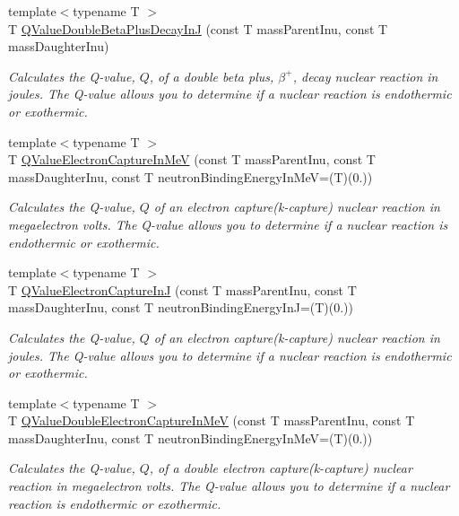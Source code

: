 \begin{DoxyCompactItemize}
{\footnotesize template$<$typename T $>$ }\\T \mbox{\hyperlink{group___e_g_x_phys-_q_value-_beta_plus_ga3531ffda0c561a601a61f54f5c7780df}{Q\+Value\+Double\+Beta\+Plus\+Decay\+InJ}} (const T mass\+Parent\+Inu, const T mass\+Daughter\+Inu)
\begin{DoxyCompactList}\small\item\em Calculates the Q-\/value, $Q$, of a double beta plus, $\beta^+$, decay nuclear reaction in joules. The Q-\/value allows you to determine if a nuclear reaction is endothermic or exothermic. \end{DoxyCompactList}\item 
{\footnotesize template$<$typename T $>$ }\\T \mbox{\hyperlink{group___e_g_x_phys-_q_value-_electron_capture_ga9cd8502b6101614c17114e9710cdcf6c}{Q\+Value\+Electron\+Capture\+In\+MeV}} (const T mass\+Parent\+Inu, const T mass\+Daughter\+Inu, const T neutron\+Binding\+Energy\+In\+MeV=(T)(0.))
\begin{DoxyCompactList}\small\item\em Calculates the Q-\/value, $Q$ of an electron capture(k-\/capture) nuclear reaction in megaelectron volts. The Q-\/value allows you to determine if a nuclear reaction is endothermic or exothermic. \end{DoxyCompactList}\item 
{\footnotesize template$<$typename T $>$ }\\T \mbox{\hyperlink{group___e_g_x_phys-_q_value-_electron_capture_gaf2569f9c706130b730dcf55695780263}{Q\+Value\+Electron\+Capture\+InJ}} (const T mass\+Parent\+Inu, const T mass\+Daughter\+Inu, const T neutron\+Binding\+Energy\+InJ=(T)(0.))
\begin{DoxyCompactList}\small\item\em Calculates the Q-\/value, $Q$ of an electron capture(k-\/capture) nuclear reaction in joules. The Q-\/value allows you to determine if a nuclear reaction is endothermic or exothermic. \end{DoxyCompactList}\item 
{\footnotesize template$<$typename T $>$ }\\T \mbox{\hyperlink{group___e_g_x_phys-_q_value-_electron_capture_gab16ac92ae27b2c0c96c7abc35f949cb8}{Q\+Value\+Double\+Electron\+Capture\+In\+MeV}} (const T mass\+Parent\+Inu, const T mass\+Daughter\+Inu, const T neutron\+Binding\+Energy\+In\+MeV=(T)(0.))
\begin{DoxyCompactList}\small\item\em Calculates the Q-\/value, $Q$, of a double electron capture(k-\/capture) nuclear reaction in megaelectron volts. The Q-\/value allows you to determine if a nuclear reaction is endothermic or exothermic. \end{DoxyCompactList}\item 

\end{DoxyCompactItemize}

